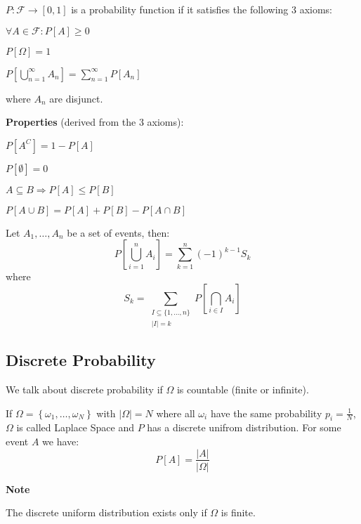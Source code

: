 \documentclass[8pt,a4paper]{extarticle}     %
\begin{document}
\begin{multicols}{4}
\begin{boxdefinition}
	$P:\mathcal{F}\rightarrow[0,1]$ is a probability function if it satisfies the following 3 axioms:
	\begin{listnr}
		\item $\forall A\in\mathcal{F}: P\left[A\right]\geq 0$ 
		\item $P[\Omega] = 1$
		\item $P[\bigcup_{n=1}^\infty A_n] = \sum_{n=1}^{\infty} P\left[A_n\right]$
	\end{listnr}
	where $A_n$ are disjunct. 
\end{boxdefinition}
\begin{listb}
	\item [] \textbf{Properties} (derived from the 3 axioms):
	\item $P\left[A^C\right] = 1-P\left[A\right]$
	\item $P\left[\emptyset\right]=0$ 
	\item $A\subseteq B\Rightarrow P[A]\leq P[B]$ 
	\item $P[A\cup B] = P[A] + P[B] - P[A\cap B]$ 
\end{listb}
\begin{boxtheorem} 
	Let $A_1,\dots,A_n$ be a set of events, then: 
	\[
		P\left[\bigcup_{i=1}^{n} A_i\right] = \sum_{k=1}^{n} (-1)^{k-1}S_k
	\]
	where 
	\[
		S_k = \sum_{ \substack{ I\subseteq \{1,\dots,n\} \\ \left\lvert I\right\rvert = k}} P\left[\bigcap_{i\in I} A_i\right] 
	\]
\end{boxtheorem}

\subsection{Discrete Probability}
We talk about discrete probability if $\Omega$ is countable (finite or infinite). 
\begin{boxdefinition} 
	If $\Omega=\left\{\omega_1,\dots,\omega_N\right\}$ with $\left\lvert\Omega\right\rvert = N$ where all $\omega_i$ have the same probability $p_i=\frac{1}{N}$, $\Omega$ is called Laplace Space and $P$ has a discrete unifrom distribution. For some event $A$ we have: 
	\[
		P[A] = \frac{\left\lvert A\right\rvert }{\left\lvert \Omega\right\rvert } 
	\]
\end{boxdefinition}
\begin{listb}
	\item [] \textbf{Note}
	\item The discrete uniform distribution exists only if $\Omega$ is finite. 
\end{listb}

\end{multicols}
\end{document}

